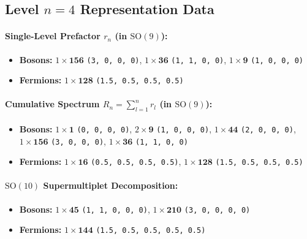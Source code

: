 \documentclass[11pt,a4paper]{article}
\begin{document}
\subsection{Level $n = 4$ Representation Data}
\paragraph{Single-Level Prefactor $r_n$ (in $\mathrm{SO}(9)$):}
\begin{itemize}
    \item \textbf{Bosons:} $1 \times \mathbf{156}$ \texttt{(3, 0, 0, 0)}, $1 \times \mathbf{36}$ \texttt{(1, 1, 0, 0)}, $1 \times \mathbf{9}$ \texttt{(1, 0, 0, 0)}
    \item \textbf{Fermions:} $1 \times \mathbf{128}$ \texttt{(1.5, 0.5, 0.5, 0.5)}
\end{itemize}
\paragraph{Cumulative Spectrum $R_n = \sum_{l=1}^n r_l$ (in $\mathrm{SO}(9)$):}
\begin{itemize}
    \item \textbf{Bosons:} $1 \times \mathbf{1}$ \texttt{(0, 0, 0, 0)}, $2 \times \mathbf{9}$ \texttt{(1, 0, 0, 0)}, $1 \times \mathbf{44}$ \texttt{(2, 0, 0, 0)}, $1 \times \mathbf{156}$ \texttt{(3, 0, 0, 0)}, $1 \times \mathbf{36}$ \texttt{(1, 1, 0, 0)}
    \item \textbf{Fermions:} $1 \times \mathbf{16}$ \texttt{(0.5, 0.5, 0.5, 0.5)}, $1 \times \mathbf{128}$ \texttt{(1.5, 0.5, 0.5, 0.5)}
\end{itemize}
\paragraph{$\mathrm{SO}(10)$ Supermultiplet Decomposition:}
\begin{itemize}
    \item \textbf{Bosons:} $1 \times \mathbf{45}$ \texttt{(1, 1, 0, 0, 0)}, $1 \times \mathbf{210}$ \texttt{(3, 0, 0, 0, 0)}
    \item \textbf{Fermions:} $1 \times \mathbf{144}$ \texttt{(1.5, 0.5, 0.5, 0.5, 0.5)}
\end{itemize}
\end{document}
